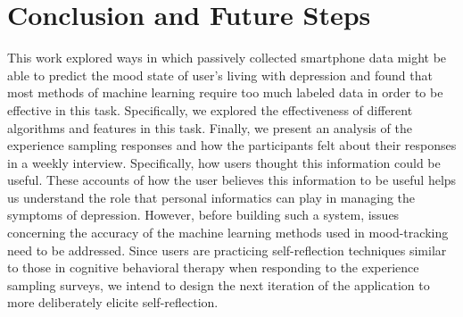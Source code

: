 \section{Conclusion and Future Steps}
This work explored ways in which passively collected smartphone data 
might be able to predict the mood state of user's living with depression
and found that most methods of machine learning require too much labeled 
data in order to be effective in this task. Specifically, we explored 
the effectiveness of different algorithms and features in this task.
Finally, we present an analysis of the experience sampling responses
and how the participants felt about their responses
in a weekly interview.  Specifically, how users thought this information
could be useful. These accounts of how the user believes this information to be useful
helps us understand the role that personal informatics can play in 
managing the symptoms of depression.  However, before building
such a system, issues concerning the accuracy of the machine learning methods
used in mood-tracking need to be addressed.  Since users are practicing
self-reflection techniques similar to those in cognitive behavioral therapy
when responding to the experience sampling surveys, we intend to design
the next iteration of the application to more deliberately elicite
self-reflection.

\iffalse